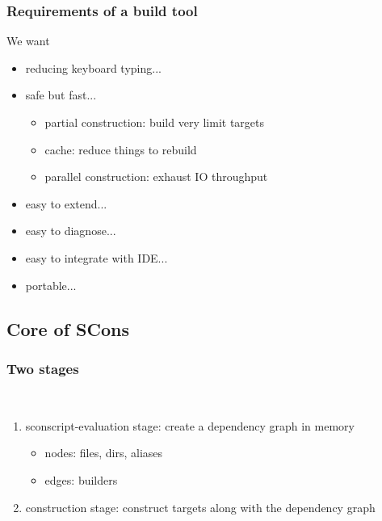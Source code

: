 \documentclass[lualatex]{beamer}
\begin{document}
\begin{frame}
  \frametitle{Requirements of a build tool}

  \begin{block}{We want}
    \begin{itemize}
    \item reducing keyboard typing...
    \item<2-> safe but fast...
      \begin{itemize}
      \item partial construction: build very limit targets
      \item cache: reduce things to rebuild
      \item parallel construction: exhaust IO throughput
      \end{itemize}
    \item<3-> easy to extend...
    \item<4-> easy to diagnose...
    \item<5-> easy to integrate with IDE...
    \item<6-> portable...
    \end{itemize}
  \end{block}
\end{frame}

\subsection{Core of SCons}

\begin{frame}
  \frametitle{Two stages}

  \begin{block}{~}
    \begin{enumerate}
    \item sconscript-evaluation stage: create a dependency graph in memory
      \begin{itemize}
      \item nodes: files, dirs, aliases
      \item edges: builders
      \end{itemize}
    \item construction stage: construct targets along with the dependency graph
    \end{enumerate}
  \end{block}
\end{frame}
\end{document}
